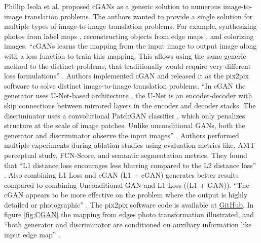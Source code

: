 Phillip Isola et al.\cite{isola2018imagetoimage} proposed \acp{cGAN} as a generic solution to numerous image-to-image translation problems. The authors wanted to provide a single solution for multiple types of image-to-image translation problems. For example, synthesizing photos from label maps \cite{cordts2016cityscapes}, reconstructing objects from edge maps \cite{zhu2018generative} \cite{6909426} , and colorizing images. ``\acp{cGAN} learns the mapping from the input image to output image along with a loss function to train this mapping. This allows using the same generic method to the distinct problems, that traditionally would require very different loss formulations'' \cite{isola2018imagetoimage}. Authors implemented \ac{cGAN} and released it as the pix2pix software to solve distinct image-to-image translation problems. ``In \ac{cGAN} the generator uses U-Net-based architecture \cite{ronneberger2015unet}, the U-Net is an encoder-decoder with skip connections between mirrored layers in the encoder and decoder stacks. The discriminator uses a convolutional PatchGAN classifier \cite{li2016precomputed}, which only penalizes structure at the scale of image patches. Unlike unconditional \acp{GAN}, both the generator and discriminator observe the input images'' \cite{isola2018imagetoimage}. Authors performed multiple experiments during ablation studies using evaluation metrics like, \ac{AMT} perceptual study, FCN-Score, and semantic segmentation metrics. They found that ``L1 distance loss encourages less blurring compared to the L2 distance loss'' \cite{isola2018imagetoimage}. Also combining L1 Loss and \ac{cGAN} (L1 + \ac{cGAN}) generates better results compared to combining Unconditional \ac{GAN} and L1 Loss ((L1 + \ac{GAN})). ``The \ac{cGAN} appears to be more effective on the problem where the output is highly detailed or photographic'' \cite{isola2018imagetoimage}. The pix2pix software code is available at \href{https://github.com/phillipi/pix2pix.}{GitHub}. In figure \ref{fig:CGAN} the mapping from edges \textrightarrow photo transformation illustrated, and ``both generator and discriminator are conditioned on auxiliary information like input edge map'' \cite{isola2018imagetoimage}.



